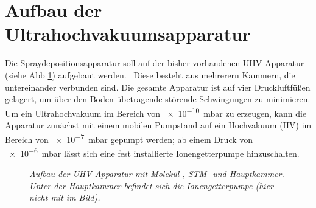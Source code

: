 \section{Aufbau der Ultrahochvakuumsapparatur}\label{kapaufbau}

Die Spraydepositionsapparatur soll auf der bisher vorhandenen UHV-Apparatur (siehe Abb
\ref{uhvaufbau}) aufgebaut werden.~%
 Diese besteht aus mehrerern Kammern, die untereinander verbunden sind. Die gesamte Apparatur ist
auf vier Druckluftfüßen gelagert, um über den Boden übetragende störende Schwingungen zu minimieren. Um ein
Ultrahochvakuum im Bereich von \SI{e-10}{mbar} zu erzeugen, kann die Apparatur zunächst mit einem
mobilen Pumpstand %
auf ein Hochvakuum (HV) im Bereich von
\SI{e-7}{mbar} gepumpt werden; ab einem Druck von \SI{e-6}{mbar} lässt sich eine fest installierte
Ionengetterpumpe hinzuschalten.

\begin{figure}[H]
\centering
\sffamily

\caption{\textit{Aufbau der UHV-Apparatur mit Molekül-, STM- und Hauptkammer. Unter der
Hauptkammer befindet sich die Ionengetterpumpe (hier nicht mit im Bild).}}
\label{uhvaufbau}
\end{figure}

